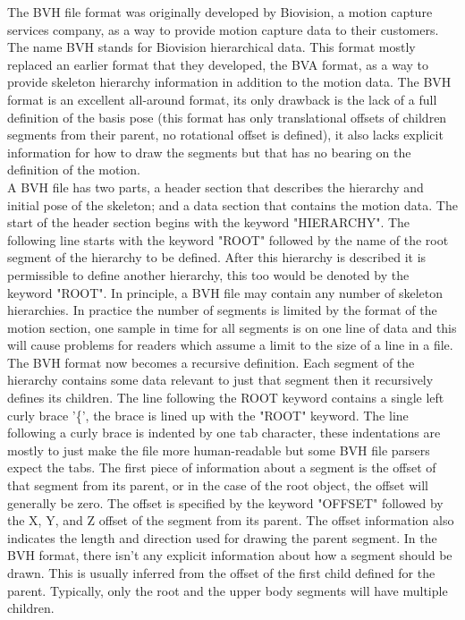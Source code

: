 The BVH file format was originally developed by Biovision, a motion capture services company, as a way to provide motion capture data to their customers. The name BVH stands for Biovision hierarchical data. This format mostly replaced an earlier format that they developed, the BVA format, as a way to provide skeleton hierarchy information in addition to the motion data. The BVH format is an excellent all-around format, its only drawback is the lack of a full definition of the basis pose (this format has only translational offsets of children segments from their parent, no rotational offset is defined), it also lacks explicit information for how to draw the segments but that has no bearing on the definition of the motion.\\

A BVH file has two parts, a header section that describes the hierarchy and initial pose of the skeleton; and a data section that contains the motion data. The start of the header section begins with the keyword "HIERARCHY". The following line starts with the keyword "ROOT" followed by the name of the root segment of the hierarchy to be defined. After this hierarchy is described it is permissible to define another hierarchy, this too would be denoted by the keyword "ROOT". In principle, a BVH file may contain any number of skeleton hierarchies. In practice the number of segments is limited by the format of the motion section, one sample in time for all segments is on one line of data and this will cause problems for readers which assume a limit to the size of a line in a file.\\

The BVH format now becomes a recursive definition. Each segment of the hierarchy contains some data relevant to just that segment then it recursively defines its children. The line following the ROOT keyword contains a single left curly brace '\{', the brace is lined up with the "ROOT" keyword. The line following a curly brace is indented by one tab character, these indentations are mostly to just make the file more human-readable but some BVH file parsers expect the tabs. The first piece of information about a segment is the offset of that segment from its parent, or in the case of the root object, the offset will generally be zero. The offset is specified by the keyword "OFFSET" followed by the X, Y, and Z offset of the segment from its parent. The offset information also indicates the length and direction used for drawing the parent segment. In the BVH format, there isn't any explicit information about how a segment should be drawn. This is usually inferred from the offset of the first child defined for the parent. Typically, only the root and the upper body segments will have multiple children.\\

